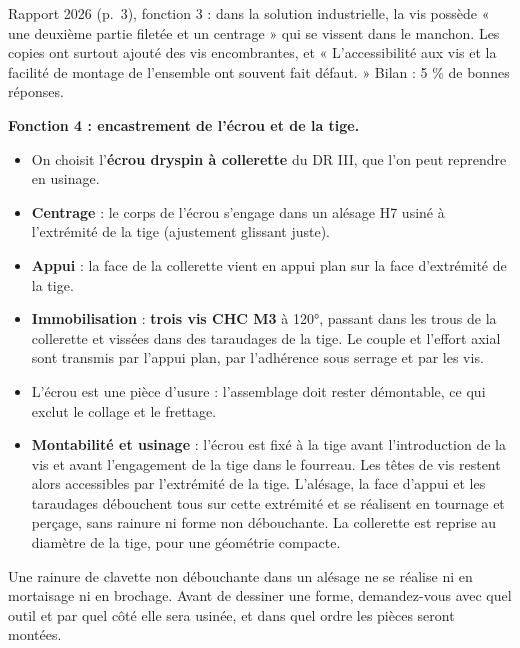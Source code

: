 \documentclass[11pt,a4paper]{article}
\providecommand{\tightlist}{\setlength{\itemsep}{0pt}\setlength{\parskip}{0pt}}
\begin{document}
\begin{jury}

Rapport 2026 (p.~3), fonction 3 : dans la solution industrielle, la vis possède « une deuxième partie filetée et un centrage » qui se vissent dans le manchon. Les copies ont surtout ajouté des vis encombrantes, et « L'accessibilité aux vis et la facilité de montage de l'ensemble ont souvent fait défaut. » Bilan : 5 \% de bonnes réponses.

\end{jury}

\textbf{Fonction 4 : encastrement de l'écrou et de la tige.}

\begin{itemize}
\tightlist
\item
  On choisit l'\textbf{écrou dryspin à collerette} du DR III, que l'on peut reprendre en usinage.
\item
  \textbf{Centrage} : le corps de l'écrou s'engage dans un alésage H7 usiné à l'extrémité de la tige (ajustement glissant juste).
\item
  \textbf{Appui} : la face de la collerette vient en appui plan sur la face d'extrémité de la tige.
\item
  \textbf{Immobilisation} : \textbf{trois vis CHC M3} à 120°, passant dans les trous de la collerette et vissées dans des taraudages de la tige. Le couple et l'effort axial sont transmis par l'appui plan, par l'adhérence sous serrage et par les vis.
\item
  L'écrou est une pièce d'usure : l'assemblage doit rester démontable, ce qui exclut le collage et le frettage.
\item
  \textbf{Montabilité et usinage} : l'écrou est fixé à la tige avant l'introduction de la vis et avant l'engagement de la tige dans le fourreau. Les têtes de vis restent alors accessibles par l'extrémité de la tige. L'alésage, la face d'appui et les taraudages débouchent tous sur cette extrémité et se réalisent en tournage et perçage, sans rainure ni forme non débouchante. La collerette est reprise au diamètre de la tige, pour une géométrie compacte.
\end{itemize}

\begin{piege}

Une rainure de clavette non débouchante dans un alésage ne se réalise ni en mortaisage ni en brochage. Avant de dessiner une forme, demandez-vous avec quel outil et par quel côté elle sera usinée, et dans quel ordre les pièces seront montées.

\end{piege}
\end{document}
